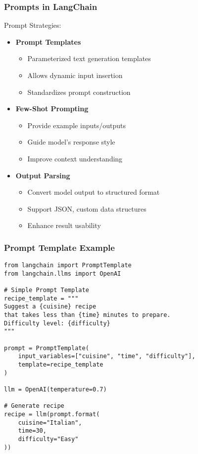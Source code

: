 \begin{frame}\frametitle{Prompts in LangChain}

Prompt Strategies:
\begin{itemize}
\item \textbf{Prompt Templates}
    \begin{itemize}
    \item Parameterized text generation templates
    \item Allows dynamic input insertion
    \item Standardizes prompt construction
    \end{itemize}

\item \textbf{Few-Shot Prompting}
    \begin{itemize}
    \item Provide example inputs/outputs
    \item Guide model's response style
    \item Improve context understanding
    \end{itemize}

\item \textbf{Output Parsing}
    \begin{itemize}
    \item Convert model output to structured format
    \item Support JSON, custom data structures
    \item Enhance result usability
    \end{itemize}
\end{itemize}

\end{frame}

\begin{frame}[fragile]\frametitle{Prompt Template Example}

\begin{lstlisting}
from langchain import PromptTemplate
from langchain.llms import OpenAI

# Simple Prompt Template
recipe_template = """
Suggest a {cuisine} recipe 
that takes less than {time} minutes to prepare.
Difficulty level: {difficulty}
"""

prompt = PromptTemplate(
    input_variables=["cuisine", "time", "difficulty"],
    template=recipe_template
)

llm = OpenAI(temperature=0.7)

# Generate recipe
recipe = llm(prompt.format(
    cuisine="Italian", 
    time=30, 
    difficulty="Easy"
))
\end{lstlisting}

\end{frame}

